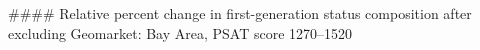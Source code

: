 #### Relative percent change in first-generation status composition after excluding Geomarket: Bay Area, PSAT score 1270–1520
